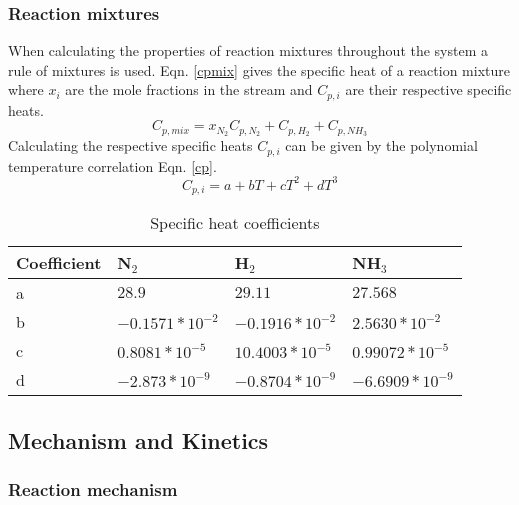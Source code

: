 {\subsubsection{Reaction mixtures}
When calculating the properties of reaction mixtures throughout the system a rule of mixtures is used. Eqn. \ref{cpmix} gives the specific heat of a reaction mixture where $x_{i}$ are the mole fractions in the stream and $C_{p,i}$ are their respective specific heats. 
\begin{equation}
\label{cpmix}
	C_{p,mix} = x_{N_2}C_{p,N_2} + C_{p,H_2} + C_{p,NH_3}
\end{equation}
Calculating the respective specific heats  $C_{p,i}$ can be given by the polynomial temperature correlation Eqn. \ref{cp}.
\begin{equation}
\label{cp}
C_{p,i} = a + bT + cT^2 + dT^3
\end{equation}
\begin{table}
\caption{Specific heat coefficients \cite{Morgan2013}}
\label{cpco}
	\begin{center}
		 \begin{tabular}{|l|l|l|l|}
		\hline
			Coefficient & 
			N$_2$               & H$_2$               & NH$_3$              \\
			\hline
			a           & $28.9$               & $29.11$              & $27.568$             \\
			\hline
			b           & $-0.1571*10^{-2}$ & $-0.1916*10^{-2}$ & $2.5630*10^{-2}$  \\ \hline
			c           & $0.8081*10^{-5}$  & $10.4003*10^{-5}$  & $0.99072*10^{-5}$ \\
			\hline
			d           & $-2.873*10^{-9}$  & $-0.8704*10^{-9}$ & $-6.6909*10^{-9}$ \\
			\hline
		\end{tabular}
	
	\end{center}
\end{table}

\subsection{Mechanism and Kinetics}

\subsubsection{Reaction mechanism}

}
